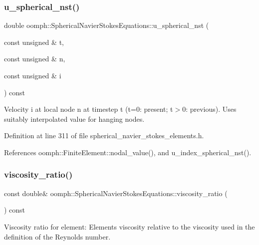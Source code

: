 \subsubsection{\texorpdfstring{u\+\_\+spherical\+\_\+nst()}{u\_spherical\_nst()}\hspace{0.1cm}{\footnotesize\ttfamily [2/2]}}
{\footnotesize\ttfamily double oomph\+::\+Spherical\+Navier\+Stokes\+Equations\+::u\+\_\+spherical\+\_\+nst (\begin{DoxyParamCaption}\item[{const unsigned \&}]{t,  }\item[{const unsigned \&}]{n,  }\item[{const unsigned \&}]{i }\end{DoxyParamCaption}) const\hspace{0.3cm}{\ttfamily [inline]}}



Velocity i at local node n at timestep t (t=0\+: present; t$>$0\+: previous). Uses suitably interpolated value for hanging nodes. 



Definition at line 311 of file spherical\+\_\+navier\+\_\+stokes\+\_\+elements.\+h.



References oomph\+::\+Finite\+Element\+::nodal\+\_\+value(), and u\+\_\+index\+\_\+spherical\+\_\+nst().

\mbox{\label{classoomph_1_1SphericalNavierStokesEquations_afe25a15c1ed202d735ca335b80b1202a}} 
\subsubsection{\texorpdfstring{viscosity\+\_\+ratio()}{viscosity\_ratio()}}
{\footnotesize\ttfamily const double\& oomph\+::\+Spherical\+Navier\+Stokes\+Equations\+::viscosity\+\_\+ratio (\begin{DoxyParamCaption}{ }\end{DoxyParamCaption}) const\hspace{0.3cm}{\ttfamily [inline]}}



Viscosity ratio for element\+: Element\textquotesingle{}s viscosity relative to the viscosity used in the definition of the Reynolds number. 



